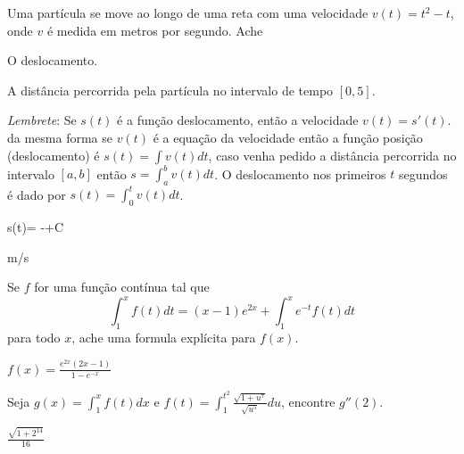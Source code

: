 \begin{exercises*}
\begin{exercise}
Uma partícula se move ao longo de uma reta com uma velocidade
$v(t)= t^2-t$, onde $v$ é medida em metros por segundo. Ache
\begin{alphalist}
  \item O deslocamento.
  \item A distância percorrida pela partícula no intervalo de tempo $[0,5]$.
\end{alphalist}
\textit{Lembrete}: Se $s(t)$ é a função deslocamento, então a velocidade
$v(t)=s'(t)$. da mesma forma se $v(t)$ é a equação da velocidade então
a função posição (deslocamento) é $s(t)=\int v(t) dt$, caso venha pedido
a distância percorrida no intervalo $[a,b]$ então \(s= \int_a^b v(t) dt\).
O deslocamento nos primeiros $t$ segundos é dado por \(s(t)= \int_0^t v(t) dt\).
\begin{answer}
\begin{mathlist}
  \item s(t)= -+C
  \item {}m/s
\end{mathlist}
\end{answer}
\end{exercise}

\begin{exercise}
Se $f$ for uma função contínua tal que
\[
  \int_1^x f(t) dt= (x-1)e^{2x}+ \int_1^x e^{-t}f(t) dt
\]
para todo $x$, ache uma formula explícita para $f(x)$.
\begin{answer}
  \(f(x)= \frac{e^{2x}(2x-1)}{1-e^{-x}}\)
\end{answer}
\end{exercise}

\begin{exercise}
  Seja
  \(g(x)=\int_1^x f(t) dx\) e
  \(f(t)=\int_1^{t^2} \frac{\sqrt{1+u^7}}{\sqrt{u^5}}du\),
  encontre $g''(2)$.
\begin{answer}
  \(\frac{\sqrt{1+2^{14}}}{16}\)
\end{answer}
\end{exercise}


\end{exercises*}
